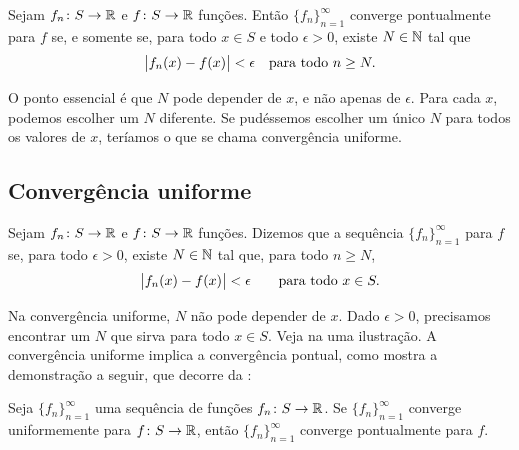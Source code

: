 \begin{prop} \label{ptwsconv:prop}
Sejam $f_n \colon S \to {\mathbb{R}}$ e $f \colon S \to {\mathbb{R}}$ funções. Então
$\{f_n\}_{n=1}^\infty$ converge pontualmente para $f$ se, e somente se,
para todo $x\in S$ e todo $\epsilon>0$, existe $N\in{\mathbb{N}}$ tal que
\begin{equation*}
\bigl\lvert {f_n(x)-f(x)} \bigr\rvert < \epsilon \quad \text{para todo } n \geq N .
\end{equation*}
\end{prop}

O ponto essencial é que $N$ pode depender de $x$, e não apenas de
$\epsilon$. Para cada $x$, podemos escolher um $N$ diferente.
Se pudéssemos escolher um único $N$ para todos os valores de $x$, teríamos
o que se chama convergência uniforme.

\subsection{Convergência uniforme}

\begin{defn}
Sejam $f_n \colon S \to {\mathbb{R}}$ e $f \colon S \to {\mathbb{R}}$ funções. Dizemos que a
sequência $\{f_n\}_{n=1}^\infty$ \emph{}
para $f$ se, para todo $\epsilon>0$, existe $N\in{\mathbb{N}}$ tal que, para todo
$n\geq N$,
\begin{equation*}
\bigl\lvert {f_n(x) - f(x)} \bigr\rvert < \epsilon \qquad \text{para todo } x \in S.
\end{equation*}
\end{defn}
\begin{myfigureht}
\caption{Na convergência uniforme, para $n\geq N$, as funções $f_n$ ficam
entre os gráficos de $f-\epsilon$ e $f+\epsilon$.%
\label{fig:uniformconv}}
\end{myfigureht}

Na convergência uniforme, $N$ não pode depender de $x$. Dado $\epsilon>0$,
precisamos encontrar um $N$ que sirva para todo $x\in S$. Veja na
 uma ilustração. A convergência uniforme implica
a convergência pontual, como mostra a demonstração a seguir, que decorre da
:

\begin{prop}
Seja $\{f_n\}_{n=1}^\infty$ uma sequência de funções
$f_n \colon S \to {\mathbb{R}}$. Se $\{f_n\}_{n=1}^\infty$ converge uniformemente
para $f \colon S \to {\mathbb{R}}$, então $\{f_n\}_{n=1}^\infty$ converge
pontualmente para $f$.
\end{prop}

